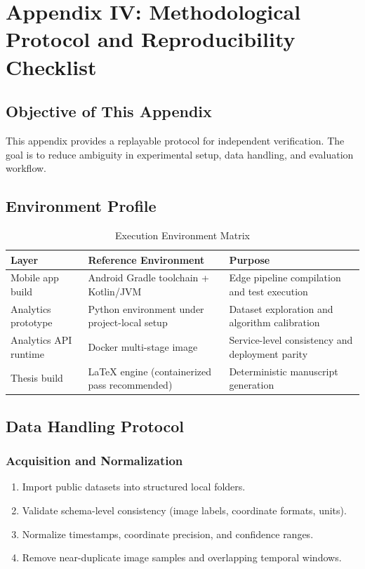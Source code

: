 \chapter{Appendix IV: Methodological Protocol and Reproducibility Checklist}
\label{app:methodological-protocol}

\section{Objective of This Appendix}
This appendix provides a replayable protocol for independent verification. The goal is to reduce ambiguity in experimental setup, data handling, and evaluation workflow.

\section{Environment Profile}
\begin{table}[ht]
\centering
\caption{Execution Environment Matrix}
{\small
\begin{tabular}{@{}L{2.8cm}L{3.8cm}L{3.2cm}@{}}
\toprule
\textbf{Layer} & \textbf{Reference Environment} & \textbf{Purpose} \\ \midrule
Mobile app build & Android Gradle toolchain + Kotlin/JVM & Edge pipeline compilation and test execution \\
Analytics prototype & Python environment under project-local setup & Dataset exploration and algorithm calibration \\
Analytics API runtime & Docker multi-stage image & Service-level consistency and deployment parity \\
Thesis build & LaTeX engine (containerized pass recommended) & Deterministic manuscript generation \\
\bottomrule
\end{tabular}
}
\end{table}

\section{Data Handling Protocol}
\subsection{Acquisition and Normalization}
\begin{enumerate}
    \item Import public datasets into structured local folders.
    \item Validate schema-level consistency (image labels, coordinate formats, units).
    \item Normalize timestamps, coordinate precision, and confidence ranges.
    \item Remove near-duplicate image samples and overlapping temporal windows.
\end{enumerate}

